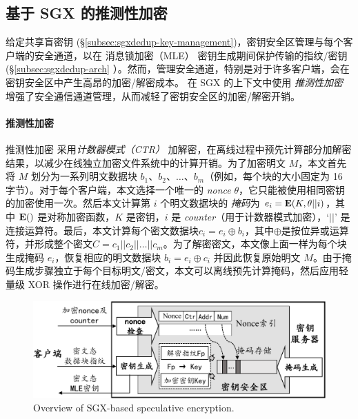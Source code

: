 \subsection{基于 SGX 的推测性加密}
\label{subsec:sgxdedup-encryption}

给定共享盲密钥 (\S\ref{subsec:sgxdedup-key-management})，密钥安全区管理与每个客户端的安全通道，以在 消息锁加密（MLE） 密钥生成期间保护传输的指纹/密钥 (\S\ref{subsec:sgxdedup-arch} ）。然而，管理安全通道，特别是对于许多客户端，会在密钥安全区中产生高昂的加密/解密成本。 \sysnameS 在 SGX 的上下文中使用 \textit{ 推测性加密} \cite{eduardo19} 增强了安全通信通道管理，从而减轻了密钥安全区的加密/解密开销。

\paragraph*{推测性加密} 推测性加密 \cite{eduardo19} 采用\textit{计数器模式（CTR）} \cite{counter} 加解密，在离线过程中预先计算部分加解密结果，以减少在线独立加密文件系统中的计算开销。为了加密明文 $M$，本文首先将 $M$ 划分为一系列明文数据块 $b_1、b_2、\ldots、b_m$（例如，每个块的大小固定为 16 字节）。对于每个客户端，本文选择一个唯一的 \textit{ nonce} $\theta$，它只能被使用相同密钥的加密使用一次。然后本文计算第 $i$ 个明文数据块的 \textit{掩码}为 $e_i = {\bf E}(K, \theta || i)$，其中 ${\bf E}()$ 是对称加密函数，$K$ 是密钥，$i$ 是 \textit{ counter}（用于计数器模式加密），`$||$' 是连接运算符。最后，本文计算每个密文数据块$c_i = e_i \oplus b_i $，其中$\oplus$是按位异或运算符，并形成整个密文$C = c_1 || c_2 || \ldots || c_m$。为了解密密文，本文像上面一样为每个块生成掩码 $e_i$，恢复相应的明文数据块 $b_i = e_i \oplus c_i$ 并因此恢复原始明文 $M$。由于掩码生成步骤独立于每个目标明文/密文，本文可以离线预先计算掩码，然后应用轻量级 XOR 操作进行在线加密/解密。

\begin{figure}[t]
\centering
\includegraphics[width=\textwidth]{pic/sgxdedup/key-enclave-arch.pdf}
\caption{Overview of SGX-based speculative encryption.}
\label{fig:sgxdedup-SpecEnc}
\end{figure}

